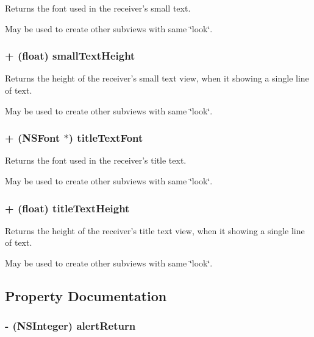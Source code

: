 Returns the font used in the receiver's small text. 

May be used to create other subviews with same \char`\"{}look\char`\"{}. \hypertarget{interface_s_s_y_alert_7e4e69784b95d9fa49cbc8dc12fc2e0e}{
\subsubsection[{smallTextHeight}]{\setlength{\rightskip}{0pt plus 5cm}+ (float) smallTextHeight }}
\label{interface_s_s_y_alert_7e4e69784b95d9fa49cbc8dc12fc2e0e}


Returns the height of the receiver's small text view, when it showing a single line of text. 

May be used to create other subviews with same \char`\"{}look\char`\"{}. \hypertarget{interface_s_s_y_alert_203afc0936f3aa64eb7ac373644902b2}{
\subsubsection[{titleTextFont}]{\setlength{\rightskip}{0pt plus 5cm}+ (NSFont $\ast$) titleTextFont }}
\label{interface_s_s_y_alert_203afc0936f3aa64eb7ac373644902b2}


Returns the font used in the receiver's title text. 

May be used to create other subviews with same \char`\"{}look\char`\"{}. \hypertarget{interface_s_s_y_alert_1b78c67ac1fbc0cd72bee1875f49fa3a}{
\subsubsection[{titleTextHeight}]{\setlength{\rightskip}{0pt plus 5cm}+ (float) titleTextHeight }}
\label{interface_s_s_y_alert_1b78c67ac1fbc0cd72bee1875f49fa3a}


Returns the height of the receiver's title text view, when it showing a single line of text. 

May be used to create other subviews with same \char`\"{}look\char`\"{}. 

\subsection{Property Documentation}
\hypertarget{interface_s_s_y_alert_b3065737274d58b88c313f36a54316eb}{
\subsubsection[{alertReturn}]{\setlength{\rightskip}{0pt plus 5cm}- (NSInteger) alertReturn}}
\label{interface_s_s_y_alert_b3065737274d58b88c313f36a54316eb}


